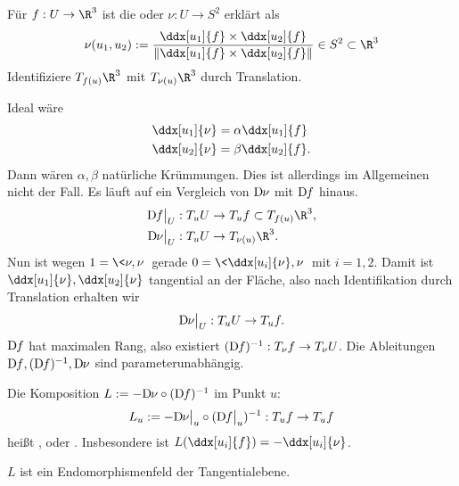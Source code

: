 \begin{df}
	Für $f: U \to \R^3$ ist die  oder  $\nu: U \to S^2$ erklärt als
	\[
		\nu(u_1, u_2) := \dfrac{\ddx[u_1]{f} \times \ddx[u_2]{f}}{\|\ddx[u_1]{f} \times \ddx[u_2]{f}\|} \in S^2 \subset \R^3
	\]
	Identifiziere $T_{f(u)} \R^3$ mit $T_{\nu(u)}\R^3$ durch Translation.
\end{df}

Ideal wäre
\begin{align*}
	\ddx[u_1]{\nu} &= \alpha \ddx[u_1]{f} \\
	\ddx[u_2]{\nu} &= \beta \ddx[u_2]{f}.
\end{align*}
Dann wären $\alpha, \beta$ natürliche Krümmungen.
Dies ist allerdings im Allgemeinen nicht der Fall.
Es läuft auf ein Vergleich von $\Df[\nu]$ mit $\Df$ hinaus.
\begin{align*}
	\Df\big|_U : T_u U  &\bijto T_u f \subset T_{f(u)} \R^3, \\
	\Df[\nu]\big|_U : T_u U &\to T_{\nu(u)} \R^3.
\end{align*}
Nun ist wegen $1 = \<\nu, \nu\>$ gerade $0 = \<\ddx[u_i]{\nu}, \nu\>$ mit $i = 1,2$.
Damit ist $\ddx[u_1]{\nu}, \ddx[u_2]{\nu}$ tangential an der Fläche, also nach Identifikation durch Translation erhalten wir
\[
	\Df[\nu]\big|_U : T_u U \to T_u f.
\]
$\Df$ hat maximalen Rang, also existiert $(\Df)^{-1}: T_\nu f \to T_\nu U$.
Die Ableitungen $\Df, (\Df)^{-1}, \Df[\nu]$ sind parameterunabhängig.

\begin{df}[Weingartenabbildung]
	Die Komposition $L := -\Df[\nu] \circ (\Df)^{-1}$ im Punkt $u$:
	\[
		L_u := -\Df[\nu]\big|_u \circ (\Df\big|_u)^{-1} : T_u f \to T_u f
	\]
	heißt , oder .
	Insbesondere ist $L(\ddx[u_i]{f}) = - \ddx[u_i]{\nu}$.
\end{df}

$L$ ist ein Endomorphismenfeld der Tangentialebene.

